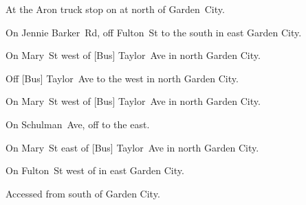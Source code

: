 

\begin{LocationList}

At the Aron truck stop on  at   north of Garden~City.

On Jennie Barker~Rd, off   Fulton~St to the south in east Garden City.

\Location{\GarageHQ \Garage}
On Mary~St west of [Bus] Taylor~Ave in north Garden City.

Off [Bus] Taylor~Ave to the west in north Garden City.

On Mary~St west of [Bus] Taylor~Ave in north Garden City.

On Schulman~Ave, off    to the east.

On Mary~St east of [Bus] Taylor~Ave in north Garden City.

On   Fulton~St west of  in east Garden City.

Accessed from 
south of Garden City.

\end{LocationList}

